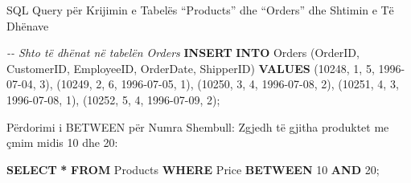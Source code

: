 \documentclass[
  ignorenonframetext,
]{beamer}
\newenvironment{Shaded}{\begin{snugshade}}{\end{snugshade}}
\newcommand{\CommentTok}[1]{\textcolor[rgb]{0.56,0.35,0.01}{\textit{#1}}}
\newcommand{\DecValTok}[1]{\textcolor[rgb]{0.00,0.00,0.81}{#1}}
\newcommand{\KeywordTok}[1]{\textcolor[rgb]{0.13,0.29,0.53}{\textbf{#1}}}
\newcommand{\NormalTok}[1]{#1}
\newcommand{\OperatorTok}[1]{\textcolor[rgb]{0.81,0.36,0.00}{\textbf{#1}}}
\newcommand{\StringTok}[1]{\textcolor[rgb]{0.31,0.60,0.02}{#1}}
\begin{document}
\begin{frame}[fragile]{SQL Query për Krijimin e Tabelës ``Products'' dhe
``Orders'' dhe Shtimin e Të Dhënave}
\label{sql-query-puxebr-krijimin-e-tabeluxebs-products-dhe-orders-dhe-shtimin-e-tuxeb-dhuxebnave-3}

\begin{Shaded}
\begin{Highlighting}[]

\CommentTok{{-}{-} Shto të dhënat në tabelën Orders}
\KeywordTok{INSERT} \KeywordTok{INTO}\NormalTok{ Orders (OrderID, CustomerID, EmployeeID, OrderDate, ShipperID) }\KeywordTok{VALUES}
\NormalTok{(}\DecValTok{10248}\NormalTok{, }\DecValTok{1}\NormalTok{, }\DecValTok{5}\NormalTok{, }\StringTok{\textquotesingle{}1996{-}07{-}04\textquotesingle{}}\NormalTok{, }\DecValTok{3}\NormalTok{),}
\NormalTok{(}\DecValTok{10249}\NormalTok{, }\DecValTok{2}\NormalTok{, }\DecValTok{6}\NormalTok{, }\StringTok{\textquotesingle{}1996{-}07{-}05\textquotesingle{}}\NormalTok{, }\DecValTok{1}\NormalTok{),}
\NormalTok{(}\DecValTok{10250}\NormalTok{, }\DecValTok{3}\NormalTok{, }\DecValTok{4}\NormalTok{, }\StringTok{\textquotesingle{}1996{-}07{-}08\textquotesingle{}}\NormalTok{, }\DecValTok{2}\NormalTok{),}
\NormalTok{(}\DecValTok{10251}\NormalTok{, }\DecValTok{4}\NormalTok{, }\DecValTok{3}\NormalTok{, }\StringTok{\textquotesingle{}1996{-}07{-}08\textquotesingle{}}\NormalTok{, }\DecValTok{1}\NormalTok{),}
\NormalTok{(}\DecValTok{10252}\NormalTok{, }\DecValTok{5}\NormalTok{, }\DecValTok{4}\NormalTok{, }\StringTok{\textquotesingle{}1996{-}07{-}09\textquotesingle{}}\NormalTok{, }\DecValTok{2}\NormalTok{);}
\end{Highlighting}
\end{Shaded}
\end{frame}

\begin{frame}[fragile]{Përdorimi i BETWEEN për Numra}
\label{puxebrdorimi-i-between-puxebr-numra}
Shembull: Zgjedh të gjitha produktet me çmim midis 10 dhe 20:

\begin{Shaded}
\begin{Highlighting}[]
\KeywordTok{SELECT} \OperatorTok{*}
\KeywordTok{FROM}\NormalTok{ Products}
\KeywordTok{WHERE}\NormalTok{ Price }\KeywordTok{BETWEEN} \DecValTok{10} \KeywordTok{AND} \DecValTok{20}\NormalTok{;}
\end{Highlighting}
\end{Shaded}
\end{frame}
\end{document}
